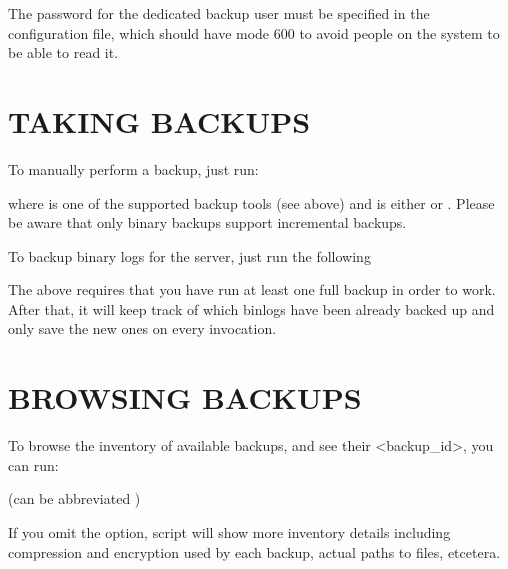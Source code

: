 \documentclass[letterpaper,10pt,english]{sphinxmanual}
\begin{document}
\sphinxAtStartPar
{}

\sphinxAtStartPar
The password for the dedicated backup user must be specified in the configuration
file, which should have mode 600 to avoid people on the system to be able to read it.


\section{TAKING BACKUPS}
\label{\detokenize{mariadb-backup-manager:taking-backups}}
\sphinxAtStartPar
To manually perform a backup, just run:

\sphinxAtStartPar
{}

\sphinxAtStartPar
where  is one of the supported backup tools (see above) and  is
either  or . Please be aware that only binary backups support incremental
backups.

\sphinxAtStartPar
To backup binary logs for the server, just run the following

\sphinxAtStartPar
{}

\sphinxAtStartPar
The above requires that you have run at least one full backup in order to work. After
that, it will keep track of which binlogs have been already backed up and only
save the new ones on every invocation.


\section{BROWSING BACKUPS}
\label{\detokenize{mariadb-backup-manager:browsing-backups}}
\sphinxAtStartPar
To browse the inventory of available backups, and see their \textless{}backup\_id\textgreater{},  you can run:

\sphinxAtStartPar
{} (can be abbreviated )

\sphinxAtStartPar
If you omit the  option, script will show more inventory details including
compression and encryption used by each backup, actual paths to files, etcetera.
\end{document}
